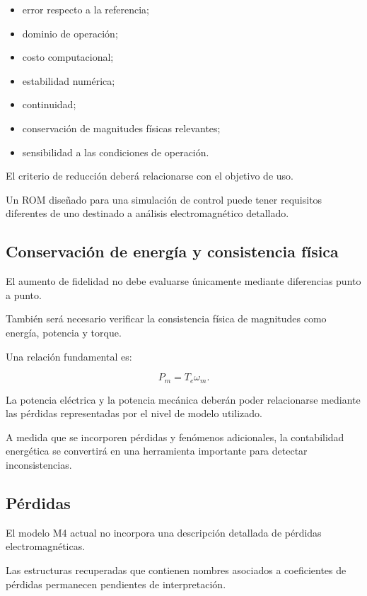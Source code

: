 \begin{itemize}
\item error respecto a la referencia;
\item dominio de operación;
\item costo computacional;
\item estabilidad numérica;
\item continuidad;
\item conservación de magnitudes físicas relevantes;
\item sensibilidad a las condiciones de operación.
\end{itemize}

El criterio de reducción deberá relacionarse con el objetivo de uso.

Un ROM diseñado para una simulación de control puede tener requisitos diferentes de uno destinado a análisis electromagnético detallado.

\subsection{Conservación de energía y consistencia física}

El aumento de fidelidad no debe evaluarse únicamente mediante diferencias punto a punto.

También será necesario verificar la consistencia física de magnitudes como energía, potencia y torque.

Una relación fundamental es:

\begin{equation}
P_m=T_e\omega_m.
\end{equation}

La potencia eléctrica y la potencia mecánica deberán poder relacionarse mediante las pérdidas representadas por el nivel de modelo utilizado.

A medida que se incorporen pérdidas y fenómenos adicionales, la contabilidad energética se convertirá en una herramienta importante para detectar inconsistencias.

\subsection{Pérdidas}

El modelo M4 actual no incorpora una descripción detallada de pérdidas electromagnéticas.

Las estructuras recuperadas que contienen nombres asociados a coeficientes de pérdidas permanecen pendientes de interpretación.

